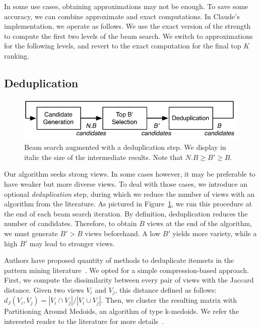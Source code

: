 In some use cases, obtaining approximations may not be enough.  To save some
accuracy, we can combine approximate and exact computations. In Claude's
implementation, we operate as follows. We use the exact version of the strength
to compute the first two levels of the beam search. We switch to approximations
for the following levels, and revert to the exact computation for the final top
$K$ ranking.

\subsection{Deduplication}
\label{sec:variety}

\begin{figure}[t!]
\centering
\includegraphics[width=\columnwidth]{images/deduplication}
\caption{Beam search augmented with a deduplication step. We display in italic
the size of the intermediate results. Note that $N.B \geq B' \geq B$.}
\label{pic:deduplication}
\end{figure}
Our algorithm seeks strong views. In some cases however, it may be preferable
to have weaker but more diverse views. To deal with those cases, we introduce
an optional \emph{deduplication} step, during which we reduce the number of
views with an algorithm from the literature. As pictured in
Figure~\ref{pic:deduplication}, we run this procedure at the end of each
beam search iteration.  By definition, deduplication reduces the number
of candidates. Therefore, to obtain $B$ views at the end of the algorithm, we
must generate $B' > B$ views beforehand. A low $B'$ yields more variety,
while a high $B'$ may lead to stronger views.

Authors have proposed quantity of methods to deduplicate itemsets in the
pattern mining literature~\cite{xin2005mining, van2006compression}. We opted
for a simple compression-based approach. First, we compute the dissimilarity
between every pair of views with the Jaccard distance. Given two views $V_i$
and $V_j$, this distance defined as follows: $d_J(V_i, V_j) = |V_i \cap V_j | /
| V_i \cup V_j |$. Then, we cluster the resulting matrix with Partitioning
Around Medoids, an algorithm of type k-medoids.  We refer the interested reader
to the literature for more details~\cite{kaufman2009finding}.






